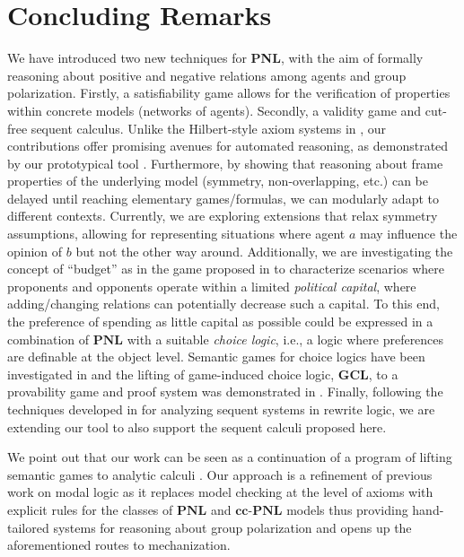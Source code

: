 \documentclass{easychair}
\newcommand{\PNL}{\textbf{PNL}}
\newcommand{\cc}{\textbf{cc}}
\begin{document}
\section{Concluding Remarks}\label{sec:conc}
We have introduced two new techniques for \PNL, with the aim of
formally reasoning about positive and negative relations among agents
and group polarization. Firstly, a satisfiability game allows for the
verification of properties within concrete models (networks of agents).
Secondly, a validity game  and cut-free sequent calculus. Unlike the
Hilbert-style axiom systems  in \cite{DBLP:journals/logcom/PedersenSA21}, our
contributions offer promising avenues for automated reasoning, as demonstrated
by our prototypical tool \cite{tool}. Furthermore, by showing that reasoning about frame
properties of the underlying model (symmetry, non-overlapping, etc.) can be
delayed until reaching elementary games/formulas, we can modularly adapt to
different contexts. Currently, we are exploring extensions that relax
symmetry assumptions, allowing for representing situations where agent $a$ may
influence the opinion of $b$ but not the other way around. Additionally, we are
investigating the concept of ``budget'' as in the game proposed in
\cite{DBLP:conf/tableaux/LangOPF19} to characterize scenarios where proponents
and opponents operate within a limited \emph{political capital}, where
adding/changing relations can potentially decrease such a capital. 
To this end, the preference of spending as little capital as possible could be expressed in a combination of $\PNL$ with a suitable \emph{choice logic}, i.e., a logic where preferences are definable at the object level. Semantic games for choice logics have been investigated in \cite{Freiman2023} and the lifting of game-induced choice logic, \textbf{GCL}, to a provability game and proof system was demonstrated in \cite{Freiman2023}.
Finally, following
the techniques developed in \cite{DBLP:journals/jlap/OlartePR23} 
for analyzing sequent systems in rewrite logic, we are extending 
our tool \cite{tool} to also support the sequent calculi proposed here. 

We point out that our work can be seen as a continuation of a program of lifting semantic games to analytic calculi \cite{DBLP:journals/sLogica/FermullerM09,Pavlova2021}. Our approach is a refinement of previous work on modal logic \cite{DBLP:conf/wollic/Freiman21,HybrJour}  as it replaces model checking at the level of axioms with explicit rules for the classes of $\PNL$ and $\cc$-$\PNL$ models thus providing hand-tailored systems for reasoning about group polarization and opens up the aforementioned routes to mechanization.
\end{document}
